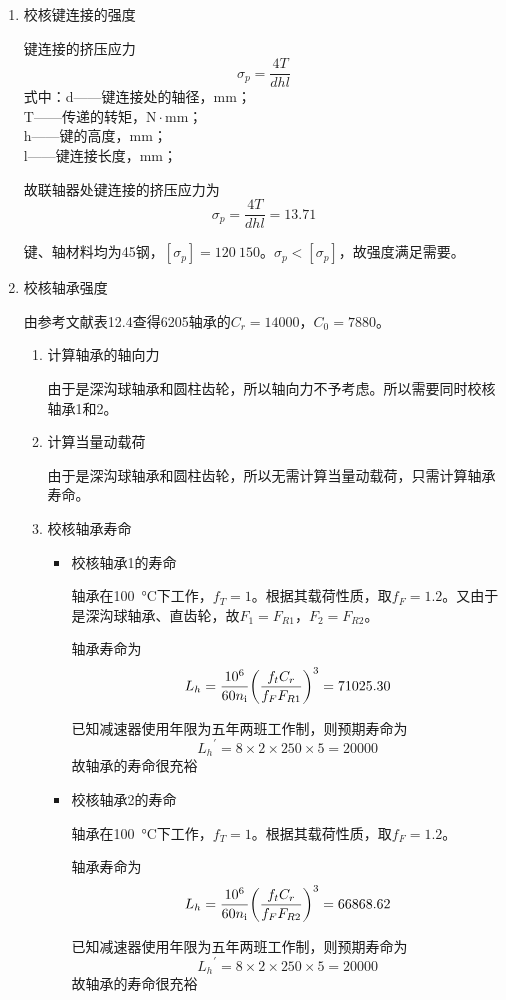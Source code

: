\begin{enumerate}[A]
	\item 校核键连接的强度
	\par 键连接的挤压应力\\$$\sigma_p=\dfrac{4T}{dhl}$$
	式中：d——键连接处的轴径，mm；\\
	T——传递的转矩，$\mathrm{N}\cdot \mathrm{mm}$；\\
	h——键的高度，mm；\\
	l——键连接长度，mm；
	\par 故联轴器处键连接的挤压应力为$$\sigma_p=\dfrac{4T}{dhl}=13.71$$
	\par 键、轴材料均为45钢，$\left[\sigma_p\right]= 120~150$。$\sigma_p<\left[\sigma_p\right]$，故强度满足需要。
	\item 校核轴承强度
	\par 由参考文献\cite{1}表12.4查得6205轴承的$C_r=14000$，$C_0=7880$。
	\begin{enumerate}[a]
		\item 计算轴承的轴向力
		\par 由于是深沟球轴承和圆柱齿轮，所以轴向力不予考虑。所以需要同时校核轴承1和2。
		\item 计算当量动载荷
		\par 由于是深沟球轴承和圆柱齿轮，所以无需计算当量动载荷，只需计算轴承寿命。
		\item 校核轴承寿命
		\begin{itemize}
			\item 校核轴承1的寿命
			\par 轴承在\SI{100}{\degreeCelsius}下工作，$f_T=1$。根据其载荷性质，取$f_F=1.2$。又由于是深沟球轴承、直齿轮，故$F_1=F_{R1}$，$F_2=F_{R2}$。
			\par 轴承寿命为
			$$L_h=\dfrac{10^6}{60n_{\mathrm{\uppercase\expandafter{\romannumeral1}}}}{\left(\dfrac{f_tC_r}{f_FF_{R1}}\right)}^3=71025.30$$
			\par 已知减速器使用年限为五年两班工作制，则预期寿命为
			$${L_h}^{\prime}=8\times 2\times 250\times 5=20000$$
			故轴承的寿命很充裕
			\item 校核轴承2的寿命
			\par 轴承在\SI{100}{\degreeCelsius}下工作，$f_T=1$。根据其载荷性质，取$f_F=1.2$。
			\par 轴承寿命为
			$$L_h=\dfrac{10^6}{60n_{\mathrm{\uppercase\expandafter{\romannumeral1}}}}{\left(\dfrac{f_tC_r}{f_FF_{R2}}\right)}^3=66868.62$$
			\par 已知减速器使用年限为五年两班工作制，则预期寿命为
			$${L_h}^{\prime}=8\times 2\times 250\times 5=20000$$
			故轴承的寿命很充裕
		\end{itemize}
	\end{enumerate}
\end{enumerate}
